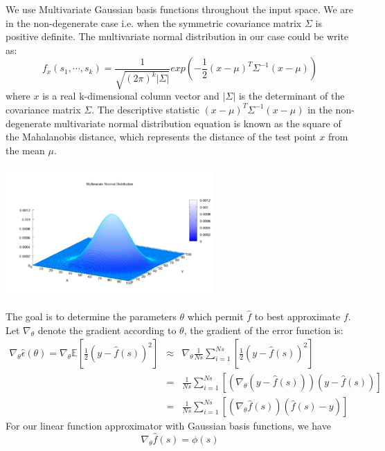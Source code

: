 \documentclass[pdftex,a4paper,11pt]{report}
\begin{document}
We use Multivariate Gaussian basis functions throughout the input space. We are in the non-degenerate case i.e. when the symmetric covariance matrix $\Sigma$ is positive definite. The multivariate normal distribution in our case could be write as:
\begin{equation}
	f_x(s_1, \cdots, s_k) = \frac{1}{\sqrt{(2\pi)^k|\Sigma|}}exp\left(-\frac{1}{2}(x - \mu)^T\Sigma^{-1}(x - \mu)\right)
\end{equation}
where $x$ is a real k-dimensional column vector and $|\Sigma|$ is the determinant of the covariance matrix $\Sigma$.
The descriptive statistic $(x - \mu)^T\Sigma^{-1}(x - \mu)$ in the non-degenerate multivariate normal distribution equation is known as the square of the Mahalanobis distance, which represents the distance of the test point $x$ from the mean $\mu$.
\begin{center}
	\includegraphics[scale=1]{images/Multivariate_Gaussian.png}
\end{center}
The goal is to determine the parameters $\mathbb{\theta}$ which permit $\hat{f}$ to best approximate $f$.
Let $\nabla_\theta$ denote the gradient according to $\theta$, the gradient of the error function is:
\begin{eqnarray}
\nabla_\theta\hat{\epsilon}(\theta) = \nabla_\theta\mathbb{E}\left[\frac{1}{2}(y - \hat{f}(s))^2\right] & \approx & \nabla_\theta\frac{1}{Ns}\sum\limits_{i=1}^{Ns}\left[\frac{1}{2}(y - \hat{f}(s))^2\right] \nonumber \\
 & = & \frac{1}{Ns}\sum\limits_{i=1}^{Ns}\left[(\nabla_\theta(y - \hat{f}(s)))(y - \hat{f}(s))\right] \nonumber \\
 & = & \frac{1}{Ns}\sum\limits_{i=1}^{Ns}\left[(\nabla_\theta\hat{f}(s))(\hat{f}(s) - y)\right]
\end{eqnarray}
For our linear function approximator with Gaussian basis functions, we have
\begin{equation}
\nabla_\theta\hat{f}(s) = \phi(s)
\end{equation}
\end{document}
